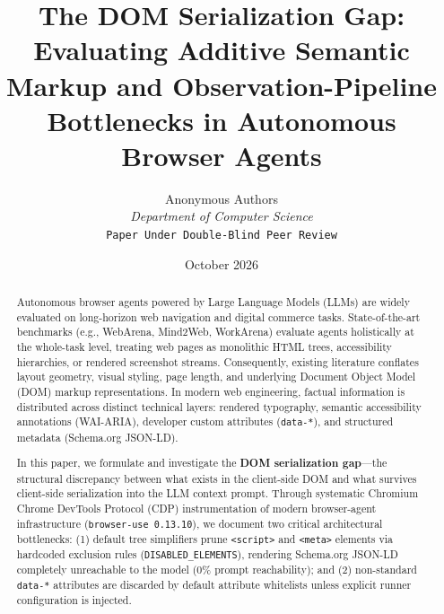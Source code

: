 \documentclass[11pt,a4paper]{article}
\title{\textbf{The DOM Serialization Gap: Evaluating Additive Semantic Markup and Observation-Pipeline Bottlenecks in Autonomous Browser Agents}}
\author{
  Anonymous Authors \\
  \textit{Department of Computer Science} \\
  \texttt{Paper Under Double-Blind Peer Review}
}
\date{October 2026}
\begin{document}
\maketitle

\begin{abstract}
Autonomous browser agents powered by Large Language Models (LLMs) are widely evaluated on long-horizon web navigation and digital commerce tasks. State-of-the-art benchmarks (e.g., WebArena, Mind2Web, WorkArena) evaluate agents holistically at the whole-task level, treating web pages as monolithic HTML trees, accessibility hierarchies, or rendered screenshot streams. Consequently, existing literature conflates layout geometry, visual styling, page length, and underlying Document Object Model (DOM) markup representations. In modern web engineering, factual information is distributed across distinct technical layers: rendered typography, semantic accessibility annotations (WAI-ARIA), developer custom attributes (\texttt{data-*}), and structured metadata (Schema.org JSON-LD). 

In this paper, we formulate and investigate the \textbf{DOM serialization gap}---the structural discrepancy between what exists in the client-side DOM and what survives client-side serialization into the LLM context prompt. Through systematic Chromium Chrome DevTools Protocol (CDP) instrumentation of modern browser-agent infrastructure (\texttt{browser-use 0.13.10}), we document two critical architectural bottlenecks: (1) default tree simplifiers prune \texttt{<script>} and \texttt{<meta>} elements via hardcoded exclusion rules (\texttt{DISABLED\_ELEMENTS}), rendering Schema.org JSON-LD completely unreachable to the model ($0\%$ prompt reachability); and (2) non-standard \texttt{data-*} attributes are discarded by default attribute whitelists unless explicit runner configuration is injected. 


\end{abstract}
\end{document}
